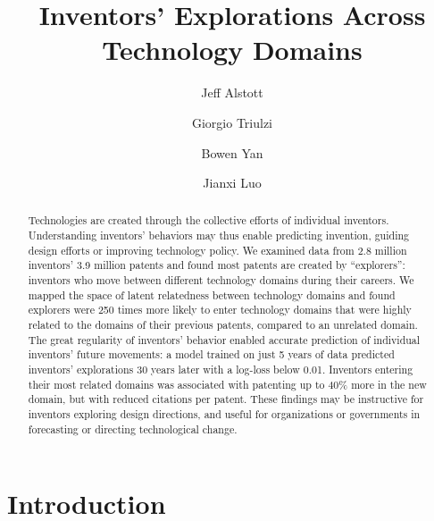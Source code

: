 \documentclass{dsj}
\begin{document}
\submitted{ - }

\title{Inventors' Explorations Across Technology Domains}

\author[*,1,2]{Jeff Alstott}
\author[*,1,3,4]{Giorgio Triulzi}
\author[1]{Bowen Yan}
\author[1]{Jianxi Luo}

\address[1]{Singapore University of Technology and Design}
\address[2]{Massachusetts Institute of Technology, Media Lab}
\address[3]{Massachusetts Institute of Technology, Institute for Data, Systems, and Society}
\address[4]{United Nations University - MERIT}
\address[*]{These authors contributed equally to this work.}


\maketitle

\begin{abstract}
Technologies are created through the collective efforts of individual inventors. Understanding inventors' behaviors may thus enable predicting invention, guiding design efforts or improving technology policy. We examined data from 2.8 million inventors' 3.9 million patents and found most patents are created by ``explorers'': inventors who move between different technology domains during their careers. We mapped the space of latent relatedness between technology domains and found explorers were 250 times more likely to enter technology domains that were highly related to the domains of their previous patents, compared to an unrelated domain. The great regularity of inventors' behavior enabled accurate prediction of individual inventors' future movements: a model trained on just 5 years of data predicted inventors' explorations 30 years later with a log-loss below 0.01. Inventors entering their most related domains was associated with patenting up to 40\% more in the new domain, but with reduced citations per patent. These findings may be instructive for inventors exploring design directions, and useful for organizations or governments in forecasting or directing technological change.
\end{abstract}

\section*{Introduction}
\end{document}
